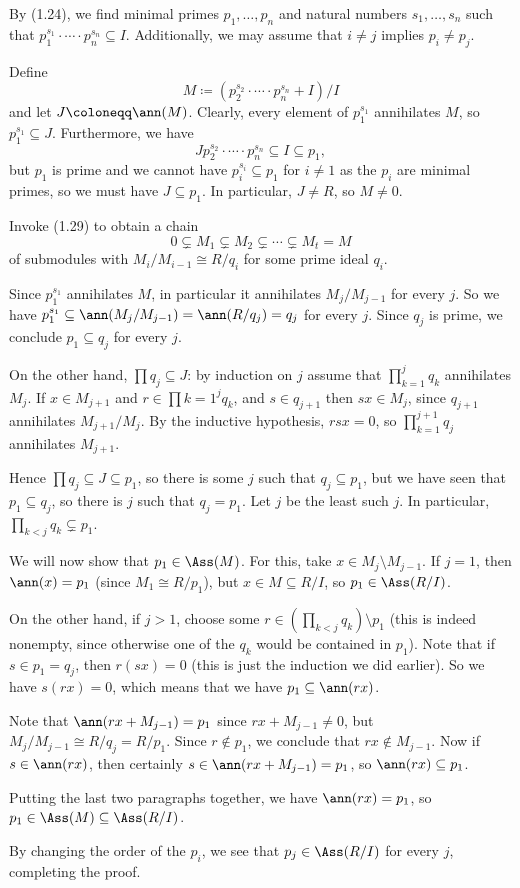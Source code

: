 By (1.24), we find minimal primes $p_1, \ldots, p_n$ and natural numbers
$s_1, \ldots, s_n$ such that $p_1^{s_1}\cdot\cdots\cdot p_n^{s_n} \subseteq I$.
Additionally, we may assume that $i\neq j$ implies $p_i\neq p_j$.

Define
\[ M\coloneqq (p_2^{s_2}\cdot\cdots\cdot p_n^{s_n} + I)/I \]
and let $J\coloneqq \ann(M)$. Clearly, every element of $p_1^{s_1}$ annihilates
$M$, so $p_1^{s_1} \subseteq J$. Furthermore, we have
\[ Jp_2^{s_2}\cdot\cdots\cdot p_n^{s_n} \subseteq I \subseteq p_1, \]
but $p_1$ is prime and we cannot have $p_i^{s_i} \subseteq p_1$ for $i \neq 1$
as the $p_i$ are minimal primes, so we must have $J \subseteq p_1$. In particular,
$J\neq R$, so $M\neq 0$.

Invoke (1.29) to obtain a chain
\[ 0 \subsetneq M_1 \subsetneq M_2 \subsetneq \cdots \subsetneq M_t = M \]
of submodules with $M_i/M_{i-1}\cong R/q_i$ for some prime ideal $q_i$.

Since $p_1^{s_1}$ annihilates $M$, in particular it annihilates $M_j/M_{j-1}$
for every $j$. So we have $p_1^{s_1} \subseteq \ann(M_j/M_{j-1}) = \ann(R/q_j) = q_j$
for every $j$. Since $q_j$ is prime, we conclude $p_1 \subseteq q_j$ for every $j$.

On the other hand, $\prod q_j \subseteq J$: by induction on $j$ assume that
$\prod_{k=1}^{j} q_k$ annihilates $M_j$.
If $x \in M_{j + 1}$ and $r \in \prod{k=1}^{j} q_k$,
and $s \in q_{j+1}$ then $sx \in M_j$, since $q_{j+1}$ annihilates $M_{j+1}/M_j$. By the
inductive hypothesis, $rsx = 0$, so $\prod_{k=1}^{j+1}q_j$ annihilates $M_{j+1}$.

Hence $\prod q_j \subseteq J \subseteq p_1$, so there is some $j$ such that
$q_j \subseteq p_1$, but we have seen that $p_1 \subseteq q_j$, so there is $j$
such that $q_j = p_1$. Let $j$ be the least such $j$. In particular,
$\prod_{k < j}q_k \subsetneq p_1$.

We will now show that $p_1 \in \Ass(M)$. For this, take $x \in M_j\setminus M_{j-1}$.
If $j = 1$, then $\ann(x) = p_1$ (since $M_1\cong R/p_1$), but $x \in M \subseteq R/I$,
so $p_1 \in \Ass(R/I)$.

On the other hand, if $j > 1$, choose some
$r \in (\prod_{k < j}q_k)\setminus p_1$ (this is indeed nonempty, since otherwise
one of the $q_k$ would be contained in $p_1$). Note that if $s \in p_1 = q_j$,
then $r(sx) = 0$ (this is just the induction we did earlier). So we have
$s(rx) = 0$, which means that we have $p_1 \subseteq \ann(rx)$.

Note that $\ann(rx + M_{j-1}) = p_1$ since $rx + M_{j-1} \neq 0$, but
$M_j/M_{j-1} \cong R/q_j = R/p_1$.
Since $r\notin p_1$, we conclude that
$rx \notin M_{j-1}$. Now if $s \in \ann(rx)$, then certainly
$s \in\ann(rx + M_{j-1}) = p_1$, so $\ann(rx) \subseteq p_1$.

Putting the last two paragraphs together, we have $\ann(rx) = p_1$, so
$p_1 \in \Ass(M) \subseteq \Ass(R/I)$.

By changing the order of the $p_i$, we see that $p_j \in \Ass(R/I)$ for
every $j$, completing the proof.
